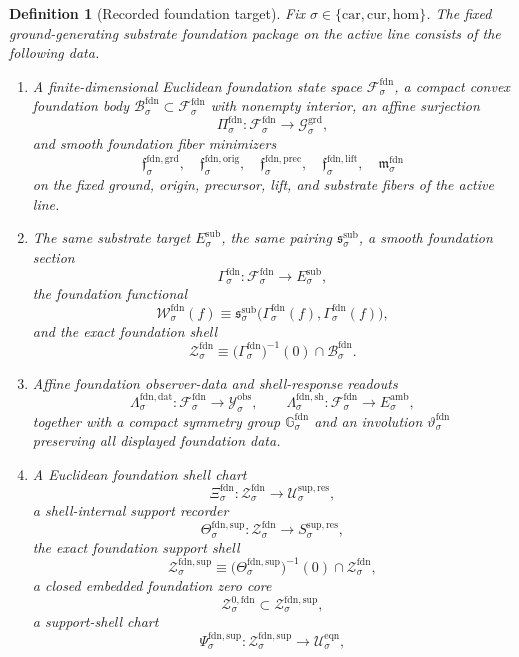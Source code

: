 \documentclass[11pt]{article}
\newcommand{\Car}{\mathrm{car}}
\newcommand{\Cur}{\mathrm{cur}}
\newcommand{\Hom}{\mathrm{hom}}
\newcommand{\DataSpace}[1]{\mathcal Y_{#1}^{\mathrm{obs}}}
\newcommand{\AmbientTarget}[1]{E_{#1}^{\mathrm{amb}}}
\newcommand{\SubTarget}[1]{E_{#1}^{\mathrm{sub}}}
\newcommand{\SubPair}[1]{\mathfrak s_{#1}^{\mathrm{sub}}}
\newcommand{\GroundSpace}[1]{\mathcal G_{#1}^{\mathrm{grd}}}
\newcommand{\FoundSpace}[1]{\mathcal F_{#1}^{\mathrm{fdn}}}
\newcommand{\FoundBody}[1]{\mathcal B_{#1}^{\mathrm{fdn}}}
\newcommand{\FoundProj}[1]{\Pi_{#1}^{\mathrm{fdn}}}
\newcommand{\FoundGroundMin}[1]{\mathfrak f_{#1}^{\mathrm{fdn,grd}}}
\newcommand{\FoundOrigMin}[1]{\mathfrak f_{#1}^{\mathrm{fdn,orig}}}
\newcommand{\FoundPrecMin}[1]{\mathfrak f_{#1}^{\mathrm{fdn,prec}}}
\newcommand{\FoundLiftMin}[1]{\mathfrak f_{#1}^{\mathrm{fdn,lift}}}
\newcommand{\FoundSubMin}[1]{\mathfrak m_{#1}^{\mathrm{fdn}}}
\newcommand{\FoundSection}[1]{\Gamma_{#1}^{\mathrm{fdn}}}
\newcommand{\FoundFunctional}[1]{\mathscr W_{#1}^{\mathrm{fdn}}}
\newcommand{\FoundData}[1]{\Lambda_{#1}^{\mathrm{fdn,dat}}}
\newcommand{\FoundShellMap}[1]{\Lambda_{#1}^{\mathrm{fdn,sh}}}
\newcommand{\FoundShellSet}[1]{\mathcal Z_{#1}^{\mathrm{fdn}}}
\newcommand{\FoundSym}[1]{\mathbb G_{#1}^{\mathrm{fdn}}}
\newcommand{\FoundTime}[1]{\vartheta_{#1}^{\mathrm{fdn}}}
\newcommand{\FoundChart}[1]{\Xi_{#1}^{\mathrm{fdn}}}
\newcommand{\FoundSupport}[1]{\Theta_{#1}^{\mathrm{fdn,sup}}}
\newcommand{\FoundSupportShell}[1]{\mathcal Z_{#1}^{\mathrm{fdn,sup}}}
\newcommand{\FoundZeroCore}[1]{\mathcal Z_{#1}^{0,\mathrm{fdn}}}
\newcommand{\FoundEqChart}[1]{\Psi_{#1}^{\mathrm{fdn,sup}}}
\newcommand{\ResSpace}[1]{\mathcal U_{#1}^{\mathrm{sup,res}}}
\newcommand{\ResTarget}[1]{S_{#1}^{\mathrm{sup,res}}}
\newcommand{\EqnSpace}[1]{\mathcal U_{#1}^{\mathrm{eqn}}}
\newtheorem{definition}{Definition}
\begin{document}
\begin{definition}[Recorded foundation target]
\label{def:foundation}
Fix \(\sigma\in\{\Car,\Cur,\Hom\}\). The fixed ground-generating substrate foundation package on the active line consists of the following data.
\begin{enumerate}
    \item A finite-dimensional Euclidean foundation state space \(\FoundSpace{\sigma}\), a compact convex foundation body \(\FoundBody{\sigma}\subset\FoundSpace{\sigma}\) with nonempty interior, an affine surjection
    \[
    \FoundProj{\sigma}:\FoundSpace{\sigma}\to\GroundSpace{\sigma},
    \]
    and smooth foundation fiber minimizers
    \[
    \FoundGroundMin{\sigma},\quad
    \FoundOrigMin{\sigma},\quad
    \FoundPrecMin{\sigma},\quad
    \FoundLiftMin{\sigma},\quad
    \FoundSubMin{\sigma}
    \]
    on the fixed ground, origin, precursor, lift, and substrate fibers of the active line.
    \item The same substrate target \(\SubTarget{\sigma}\), the same pairing \(\SubPair{\sigma}\), a smooth foundation section
    \[
    \FoundSection{\sigma}:\FoundSpace{\sigma}\to\SubTarget{\sigma},
    \]
    the foundation functional
    \[
    \FoundFunctional{\sigma}(f)
    \equiv
    \SubPair{\sigma}\bigl(\FoundSection{\sigma}(f),\FoundSection{\sigma}(f)\bigr),
    \]
    and the exact foundation shell
    \[
    \FoundShellSet{\sigma}
    \equiv
    \bigl(\FoundSection{\sigma}\bigr)^{-1}(0)\cap\FoundBody{\sigma}.
    \]
    \item Affine foundation observer-data and shell-response readouts
    \[
    \FoundData{\sigma}:\FoundSpace{\sigma}\to\DataSpace{\sigma},
    \qquad
    \FoundShellMap{\sigma}:\FoundSpace{\sigma}\to\AmbientTarget{\sigma},
    \]
    together with a compact symmetry group \(\FoundSym{\sigma}\) and an involution \(\FoundTime{\sigma}\) preserving all displayed foundation data.
    \item A Euclidean foundation shell chart
    \[
    \FoundChart{\sigma}:\FoundShellSet{\sigma}\to\ResSpace{\sigma},
    \]
    a shell-internal support recorder
    \[
    \FoundSupport{\sigma}:\FoundShellSet{\sigma}\to\ResTarget{\sigma},
    \]
    the exact foundation support shell
    \[
    \FoundSupportShell{\sigma}
    \equiv
    \bigl(\FoundSupport{\sigma}\bigr)^{-1}(0)\cap\FoundShellSet{\sigma},
    \]
    a closed embedded foundation zero core
    \[
    \FoundZeroCore{\sigma}\subset\FoundSupportShell{\sigma},
    \]
    a support-shell chart
    \[
    \FoundEqChart{\sigma}:\FoundSupportShell{\sigma}\to\EqnSpace{\sigma},
\]
\end{enumerate}
\end{definition}
\end{document}
